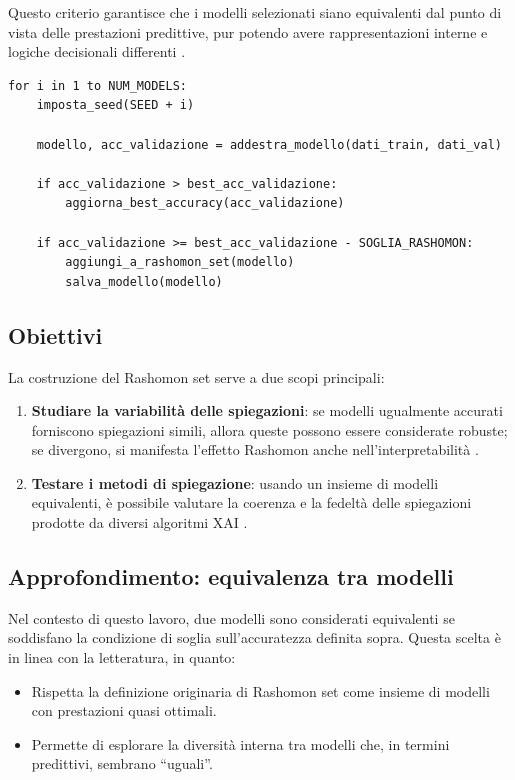 \documentclass{article}
\begin{document}
Questo criterio garantisce che i modelli selezionati siano equivalenti dal
punto di vista delle prestazioni predittive, pur potendo avere rappresentazioni
interne e logiche decisionali differenti
\citep{leventi2023consistency,mueller2023rashomon}.

\begin{lstlisting}[caption={Addestramento modelli e selezione Rashomon set}, label={lst:rashomon_training}]
for i in 1 to NUM_MODELS:
    imposta_seed(SEED + i)
    
    modello, acc_validazione = addestra_modello(dati_train, dati_val)
    
    if acc_validazione > best_acc_validazione:
        aggiorna_best_accuracy(acc_validazione)

    if acc_validazione >= best_acc_validazione - SOGLIA_RASHOMON:
        aggiungi_a_rashomon_set(modello)
        salva_modello(modello)
\end{lstlisting}

\subsection{Obiettivi}
La costruzione del Rashomon set serve a due scopi principali:
\begin{enumerate}
      \item \textbf{Studiare la variabilità delle spiegazioni}: se modelli ugualmente accurati forniscono spiegazioni simili, allora queste possono essere considerate robuste; se divergono, si manifesta l’effetto Rashomon anche nell’interpretabilità \citep{mueller2023rashomon}.
      \item \textbf{Testare i metodi di spiegazione}: usando un insieme di modelli equivalenti, è possibile valutare la coerenza e la fedeltà delle spiegazioni prodotte da diversi algoritmi XAI \citep{leventi2023consistency}.
\end{enumerate}

\subsection{Approfondimento: equivalenza tra modelli}
Nel contesto di questo lavoro, due modelli sono considerati equivalenti se
soddisfano la condizione di soglia sull’accuratezza definita sopra. Questa
scelta è in linea con la letteratura, in quanto:
\begin{itemize}
      \item Rispetta la definizione originaria di Rashomon set come insieme di modelli con
            prestazioni quasi ottimali.
      \item Permette di esplorare la diversità interna tra modelli che, in termini
            predittivi, sembrano “uguali”.
\end{itemize}
\end{document}

